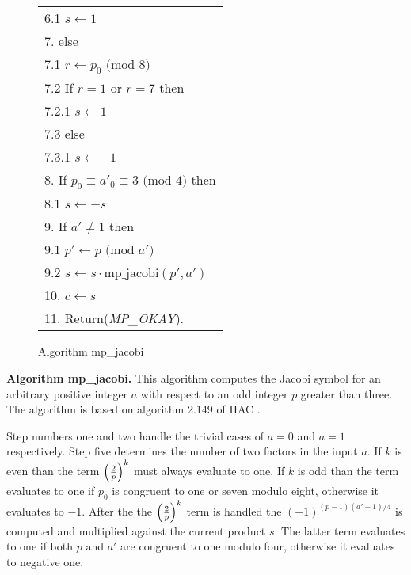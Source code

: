 \documentclass[b5paper]{book}
\begin{document}
\begin{figure}[!here]
\begin{small}
\begin{center}
\begin{tabular}{l}
\hspace{3mm}6.1  $s \leftarrow 1$ \\
7.  else \\
\hspace{3mm}7.1  $r \leftarrow p_0 \mbox{ (mod }8\mbox{)}$ \\
\hspace{3mm}7.2  If $r = 1$ or $r = 7$ then \\
\hspace{6mm}7.2.1  $s \leftarrow 1$ \\
\hspace{3mm}7.3  else \\
\hspace{6mm}7.3.1  $s \leftarrow -1$ \\
8.  If $p_0 \equiv a'_0 \equiv 3 \mbox{ (mod }4\mbox{)}$ then \\
\hspace{3mm}8.1  $s \leftarrow -s$ \\
9.  If $a' \ne 1$ then \\
\hspace{3mm}9.1  $p' \leftarrow p \mbox{ (mod }a'\mbox{)}$ \\
\hspace{3mm}9.2  $s \leftarrow s \cdot \mbox{mp\_jacobi}(p', a')$ \\
10.  $c \leftarrow s$ \\
11.  Return(\textit{MP\_OKAY}). \\
\hline
\end{tabular}
\end{center}
\end{small}
\caption{Algorithm mp\_jacobi}
\end{figure}
\textbf{Algorithm mp\_jacobi.}
This algorithm computes the Jacobi symbol for an arbitrary positive integer $a$ with respect to an odd integer $p$ greater than three.  The algorithm
is based on algorithm 2.149 of HAC \cite[pp. 73]{HAC}.  

Step numbers one and two handle the trivial cases of $a = 0$ and $a = 1$ respectively.  Step five determines the number of two factors in the
input $a$.  If $k$ is even than the term $\left ( { 2 \over p } \right )^k$ must always evaluate to one.  If $k$ is odd than the term evaluates to one 
if $p_0$ is congruent to one or seven modulo eight, otherwise it evaluates to $-1$. After the the $\left ( { 2 \over p } \right )^k$ term is handled 
the $(-1)^{(p-1)(a'-1)/4}$ is computed and multiplied against the current product $s$.  The latter term evaluates to one if both $p$ and $a'$ 
are congruent to one modulo four, otherwise it evaluates to negative one.
\end{document}
